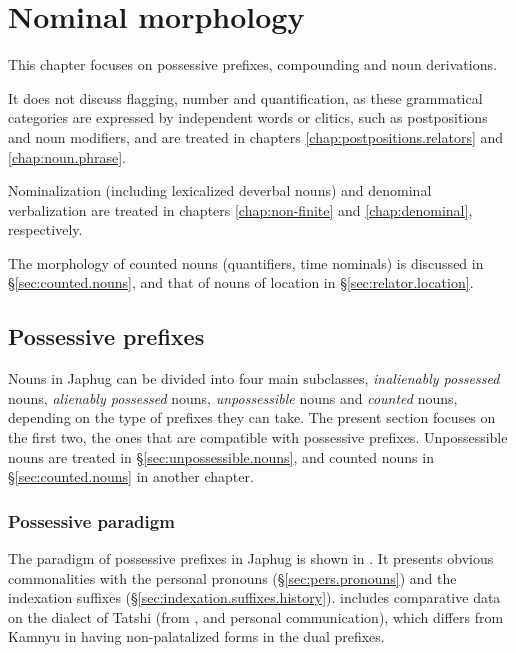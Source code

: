 \chapter{Nominal morphology} \label{chap:nominal.morphology}

This chapter focuses on possessive prefixes, compounding and noun derivations. 

It does not discuss flagging, number and quantification, as these grammatical categories are expressed by independent words or clitics, such as postpositions and noun modifiers, and are treated in chapters \ref{chap:postpositions.relators} and \ref{chap:noun.phrase}.

Nominalization (including lexicalized deverbal nouns) and denominal verbalization are treated in chapters \ref{chap:non-finite} and \ref{chap:denominal}, respectively. 

The morphology of counted nouns (quantifiers, time nominals) is discussed in §\ref{sec:counted.nouns}, and that of nouns of location in §\ref{sec:relator.location}.

\section{Possessive prefixes} \label{sec:possessive.prefixes}
Nouns in Japhug can be divided into four main subclasses, \textit{inalienably possessed} nouns, \textit{alienably possessed} nouns, \textit{unpossessible} nouns and \textit{counted} nouns, depending on the type of prefixes they can take. The present section focuses on the first two, the ones that are compatible with possessive prefixes. Unpossessible nouns are treated in §\ref{sec:unpossessible.nouns}, and counted nouns in §\ref{sec:counted.nouns} in another chapter.

\subsection{Possessive paradigm} \label{sec:possessive.paradigm}
The paradigm of possessive prefixes in Japhug is shown in . It presents obvious commonalities with the personal pronouns (§\ref{sec:pers.pronouns}) and the indexation suffixes (§\ref{sec:indexation.suffixes.history}).  includes comparative data on the dialect of Tatshi (from \citealt{linluo03}, \citealt{lin11direction} and personal communication), which differs from Kamnyu in having non-palatalized forms in the dual prefixes. 


